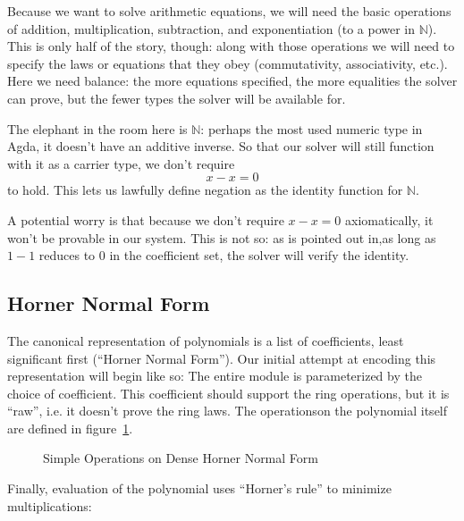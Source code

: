 \documentclass[draft, twocolumn]{article}
\theoremstyle{definition}
\theoremstyle{definition}
\begin{document}
Because we want to solve arithmetic equations, we will need the basic operations
of addition, multiplication, subtraction, and exponentiation (to a power in
\(\mathbb{N}\)). This is only half of the story, though: along with those
operations we will need to specify the laws or equations that they obey
(commutativity, associativity, etc.). Here we need balance: the more equations
specified, the more equalities the solver can prove, but the fewer types the
solver will be available for.

The elephant in the room here is \(\mathbb{N}\): perhaps the most used numeric
type in Agda, it doesn't have an additive inverse. So that our solver will still
function with it as a carrier type, we don't require
\[x - x = 0\]
to hold. This lets us lawfully define negation as the identity function for
\(\mathbb{N}\).

A potential worry is that because we don't require \(x - x = 0\)
axiomatically, it won't be provable in our system. This is not so: as is pointed
out in\cite{gregoire_proving_2005},as long as \(1 - 1\) reduces to \(0\) in the
coefficient set, the solver will verify the identity.
\subsection{Horner Normal Form}
The canonical representation of polynomials is a list of coefficients, least
significant first (``Horner Normal Form''). Our initial attempt at encoding this
representation will begin like so:
The entire module is parameterized by the choice of coefficient. This
coefficient should support the ring operations, but it is ``raw'', i.e. it
doesn't prove the ring laws. The operations\footnotemark on the polynomial
itself are defined in figure~\ref{simple-ops}.

\begin{figure}
  \caption{
    Simple Operations on Dense Horner Normal Form}
  \label{simple-ops}
\end{figure}
Finally, evaluation of the polynomial uses ``Horner's rule'' to minimize
multiplications:
\end{document}
